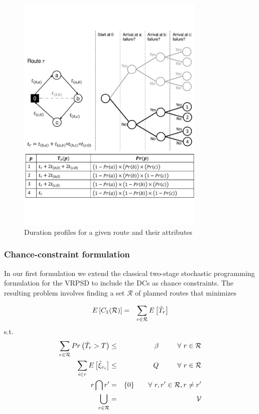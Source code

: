 \begin{figure}
    \begin{center}
    \includegraphics[width=9cm,clip=true]{./img/fvrpsddcprofiles}
    \caption{Duration profiles for a given route and their attributes}\label{f.vrpsd.dc.profiles}
    \end{center}
\end{figure}

\subsubsection{Chance-constraint formulation}\label{s.vrpsd.dc.CC}
In our first formulation we extend the classical two-stage stochastic programming formulation for the VRPSD to include the DCs as chance constraints. The resulting problem involves finding a set $\mathcal{R}$ of planned routes that minimizes

\begin{eqnarray}\label{eq.vrpsd.dc.CC}
\small
E\left[C_1(\mathcal{R})\right] &=&\sum_{r\in\mathcal{R}}E\left[\tilde{T}_r\right]\label{eq.vrpsd.dc.CC.OF}
\end{eqnarray}
\noindent s.t.
\begin{eqnarray}
\small
\label{eq.vrpsd.dc.CC.DC} \sum_{r\in\mathcal{R}}Pr\left(\tilde{T}_r>T\right)&\leq&\beta\ \ \ \ \ \ \ \ \forall \ r\in \mathcal{R}\\
\label{eq.vrpsd.dc.CC.QC} \sum_{i\in r}E\left[\tilde{\xi}_{v_i}\right]&\leq&Q\ \ \ \ \ \ \ \ \forall \ r\in \mathcal{R}\\
\label{eq.vrpsd.dc.CUSTOMER-COVERTURE} r\bigcap r'&=&\{0\}\ \ \ \ \ \ \forall \ r,r'\in\mathcal{R},r\neq r'\\
\label{eq.vrpsd.dc.SINGLE-VISIT} \bigcup_{r\in \mathcal{R}}&=&\mathcal{V}
\end{eqnarray}

